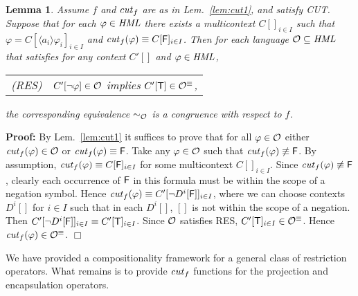 \documentclass{eptcs}
\def\hmo{{\cal O}}
\def\hml{{\it HML}}
\def\hmeq{\sim_{\cal O}}
\def\true{{\sf T}}
\def\false{{\sf F}}
\newtheorem{lemm}{Lemma}
\newenvironment{lemma}{\begin{lemm} \rm }{\end{lemm}}
\newenvironment{proof}{\begin{trivlist} \item[\hspace{\labelsep}\bf Proof:]}{\hfill $\Box$ \end{trivlist}}
\newcommand{\diam}[1]{\langle#1\rangle}
\begin{document}
\begin{lemma}
\label{lem:cut2}
Assume $f$ and ${\it cut}_f$ are as in Lem.~\ref{lem:cut1}, and satisfy CUT. Suppose that for each $\varphi \in \hml$ there exists a multicontext $C[]_{ i \in I}$ such that 
$\varphi = C[\diam{a_i} \varphi_i]_{i \in I}$ and ${\it cut}_f(\varphi) \equiv C[\false]_{i \in I}$.
Then for each language $\hmo \subseteq \hml$ that satisfies for any context $C'[]$ and $\varphi \in \hml$,
\begin{center}
\begin{tabular}{l l}
(RES) & $C'[\neg \varphi] \in \hmo$ implies $C'[\true] \in \hmo^\equiv$,
\end{tabular}
\end{center}
the corresponding equivalence $\hmeq$ is a congruence with respect to $f$.
\end{lemma}
\begin{proof} By Lem.\ \ref{lem:cut1} it suffices to prove that for all $\varphi \in \hmo$ either ${\it cut}_f(\varphi) \in \hmo$ or ${\it cut}_f(\varphi) \equiv \false$. Take any $\varphi \in \hmo$ such that ${\it cut}_f(\varphi) \not \equiv \false$. By assumption, ${\it cut}_f(\varphi) \equiv C[\false]_{i \in I}$ for some multicontext $C[]_{i \in I}$. Since ${\it cut}_f(\varphi) \not \equiv \false$, clearly each occurrence of $\false$ in this formula must be within the scope of a negation symbol.
Hence ${\it cut}_f(\varphi) \equiv C'[\neg D^i[\false]]_{i \in I}$, where we can choose contexts $D^i[]$ for $i\in I$ such that in each $D^i[]$, $[]$ is not within the scope of a negation.
Then $C'[\neg D^i[\false]]_{i \in I} \equiv C'[\true]_{i \in I}$. Since $\hmo$ satisfies RES, $C'[\true]_{i \in I} \in \hmo^\equiv$. Hence ${\it cut}_f(\varphi) \in \hmo^\equiv$.
\end{proof}
We have provided a compositionality framework for a general class of restriction operators. What remains is to provide ${\it cut}_f$ functions for the projection and encapsulation operators.
\end{document}
